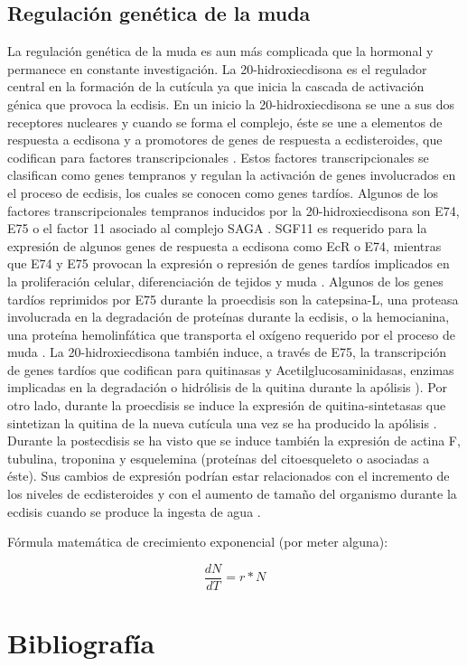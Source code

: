 \documentclass[a4paper]{article}
\begin{document}
\subsection{Regulación genética de la muda}
La regulación genética de la muda es aun más complicada que la hormonal y permanece en constante investigación. La 20-hidroxiecdisona es el regulador central en la formación de la cutícula ya que inicia la cascada de activación génica que provoca la ecdisis. En un inicio la 20-hidroxiecdisona se une a sus dos receptores nucleares y cuando se forma el complejo, éste se une a elementos de respuesta a ecdisona y a promotores de genes de respuesta a ecdisteroides, que codifican para factores transcripcionales \citep{Puthumana2017}. Estos factores transcripcionales se clasifican como genes tempranos y regulan la activación de genes involucrados en el proceso de ecdisis, los cuales se conocen como genes tardíos. Algunos de los factores transcripcionales tempranos inducidos por la 20-hidroxiecdisona son E74, E75 o el factor 11 asociado al complejo SAGA \citep{Qian2014}. SGF11 es requerido para la expresión de algunos genes de respuesta a ecdisona como EcR o E74, mientras que E74 y E75 provocan la expresión o represión de genes tardíos implicados en la proliferación celular, diferenciación de tejidos y muda \citep{Dubro2005}. Algunos de los genes tardíos reprimidos por E75 durante la proecdisis son la catepsina-L, una proteasa involucrada en la degradación de proteínas durante la ecdisis, o la hemocianina, una proteína hemolinfática que transporta el oxígeno requerido por el proceso de muda \citep{Qian2014}. La 20-hidroxiecdisona también induce, a través de E75, la transcripción de genes tardíos que codifican para quitinasas y Acetilglucosaminidasas, enzimas implicadas en la degradación o hidrólisis de la quitina durante la apólisis \citep{Zou2004}). Por otro lado, durante la proecdisis se induce la expresión de quitina-sintetasas que sintetizan la quitina de la nueva cutícula una vez se ha producido la apólisis \citep{Qian2014}. Durante la postecdisis se ha visto que se induce también la expresión de actina F, tubulina, troponina y esquelemina (proteínas del citoesqueleto o asociadas a éste). Sus cambios de expresión podrían estar relacionados con el incremento de los niveles de ecdisteroides y con el aumento de tamaño del organismo durante la ecdisis cuando se produce la ingesta de agua \citep{Tom2014}.\par Fórmula matemática de crecimiento exponencial (por meter alguna):\par 

\begin{displaymath}
\frac{dN}{dT}=r*N
\end{displaymath}

\section{Bibliografía}

\end{document}
